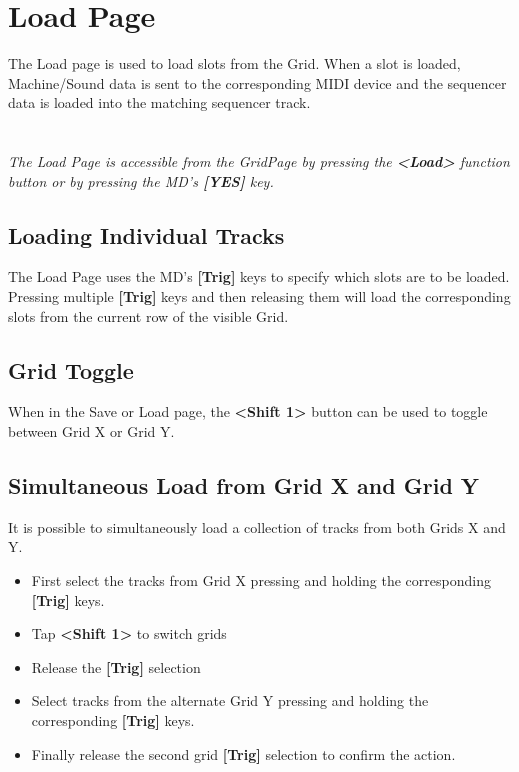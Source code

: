 \chapter{Load Page}
The Load page is used to load slots from the Grid. When a slot is loaded, Machine/Sound data is sent to the corresponding MIDI device and the sequencer data is loaded into the matching sequencer track.\\
\\
\\
\textit{The Load Page is accessible from the GridPage by pressing the  \textbf{<Load>} function button or by pressing the MD's \textbf{[YES]} key.}

\newpage
\section{Loading Individual Tracks}
The Load Page uses the MD's \textbf{[Trig]} keys to specify which slots are to be loaded. Pressing multiple \textbf{[Trig]} keys and then releasing them will load the corresponding slots from the current row of the visible Grid.
\section{Grid Toggle}
When in the Save or Load page, the \textbf{<Shift 1>} button can be used to toggle between Grid X or Grid Y.
\section{Simultaneous Load from Grid X and Grid Y}
It is possible to simultaneously load a collection of tracks from both Grids X and Y. 
\begin{itemize}
\item First select the tracks from Grid X pressing and holding the corresponding \textbf{[Trig]} keys.
\item Tap \textbf{<Shift 1>} to switch grids
\item Release the \textbf{[Trig]} selection
\item Select tracks from the alternate Grid Y pressing and holding the corresponding \textbf{[Trig]} keys. 
\item Finally release the second grid \textbf{[Trig]} selection to confirm the action. 
\end{itemize}

